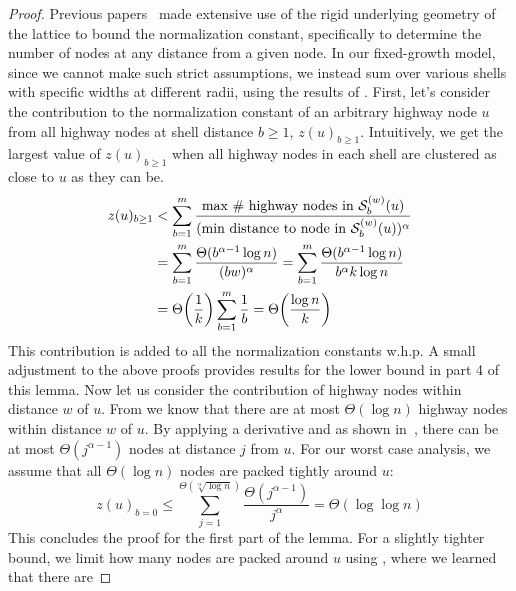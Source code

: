 \begin{proof}
    Previous papers~\cite{kleinberg2000small,martel,gila2023highway} made
    extensive use of the rigid underlying geometry of the lattice to bound the
    normalization constant, specifically to determine the number of nodes at any
    distance from a given node.
    In our fixed-growth model, since we cannot make such strict assumptions, we
    instead sum over various shells with specific widths at different radii,
    using the results of .
    First, let's consider the contribution to the normalization constant of an
    arbitrary highway node $u$ from all highway nodes at shell distance $b \geq
    1$, $z(u)_{b \geq 1}$. 
    Intuitively, we get the largest value of $z(u)_{b \geq 1}$ when all highway nodes
    in each shell are clustered as close to $u$ as they can be.
    \begin{align*}
        z(u)_{b \ge 1} &< \sum_{b = 1}^m{\frac{\text{max \# highway nodes in } \mathcal{S}_b^{(w)}(u)}{(\text{min distance to node in } \mathcal{S}_b^{(w)}(u))^\alpha}} \\
        &= \sum_{b = 1}^m{\frac{\Theta(b^{\alpha - 1} \log{n})}{(bw)^\alpha}} = \sum_{b = 1}^m{\frac{\Theta(b^{\alpha - 1} \log{n})}{b^\alpha k \log{n}}} \\
        &= \Theta\pars*{\frac{1}{k}} \sum_{b = 1}^m{\frac{1}{b}} = \Theta\pars*{\frac{\log{n}}{k}}
    \end{align*}
    This contribution is added to all the normalization constants w.h.p.
    A small adjustment to the above proofs provides results for the lower bound
    in part 4 of this lemma.
    Now let us consider the contribution of highway nodes within distance $w$ of
    $u$.
    From  we know that there are at most
    $\Theta(\log{n})$ highway nodes within distance $w$ of $u$.
    By applying a derivative and as shown in~\cite{stefanExpansion}, there can be at
    most $\Theta(j^{\alpha - 1})$ nodes at distance $j$ from $u$.
    For our worst case analysis, we assume that all $\Theta(\log{n})$ nodes are
    packed tightly around $u$:
    \begin{equation*}
        z(u)_{b = 0} \leq \sum_{j = 1}^{\Theta(\sqrt[\alpha]{\log{n}})}{\frac{\Theta(j^{\alpha - 1})}{j^\alpha}} = \Theta(\log{\log{n}})
    \end{equation*}
    This concludes the proof for the first part of the lemma.
    For a slightly tighter bound, we limit how many nodes are packed around $u$
    using , where we learned that there are

\end{proof}
